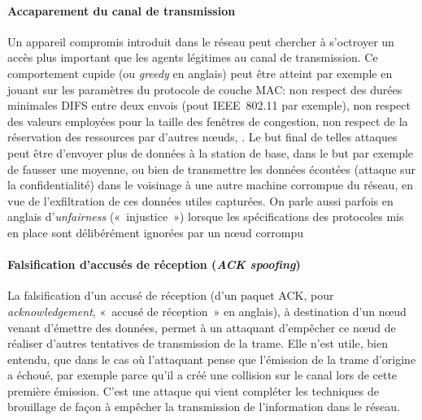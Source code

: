         \paragraph{Accaparement du canal de transmission}
Un appareil compromis introduit dans le réseau peut chercher à s'octroyer un accès plus important que les agents légitimes au canal de transmission.
Ce comportement cupide (ou \textit{greedy} en anglais) peut être atteint par exemple en jouant sur les paramètres du protocole de couche MAC: non respect des durées minimales DIFS entre deux envois (pout IEEE~802.11 par exemple), non respect des valeurs employées pour la taille des fenêtres de congestion, non respect de la réservation des ressources par d'autres nœuds, \etc.
Le but final de telles attaques peut être d'envoyer plus de données à la station de base, dans le but par exemple de fausser une moyenne, ou bien de transmettre les données écoutées (attaque sur la confidentialité) dans le voisinage à une autre machine corrompue du réseau, en vue de l'exfiltration de ces données utiles capturées.
On parle aussi parfois en anglais d'\textit{unfairness} (« injustice ») lorsque les spécifications des protocoles mis en place sont délibérément ignorées par un nœud corrompu

\paragraph{Falsification d'accusés de réception (\textit{ACK spoofing})}
La falsification d'un accusé de réception (d'un paquet ACK, pour \textit{acknowledgement}, « accusé de réception » en anglais), à destination d'un nœud venant d'émettre des données, permet à un attaquant d'empêcher ce nœud de réaliser d'autres tentatives de transmission de la trame.
Elle n'est utile, bien entendu, que dans le cas où l'attaquant pense que l'émission de la trame d'origine a échoué, par exemple parce qu'il a créé une collision sur le canal lors de cette première émission.
C'est une attaque qui vient compléter les techniques de brouillage de façon à empêcher la transmission de l'information dans le réseau.

